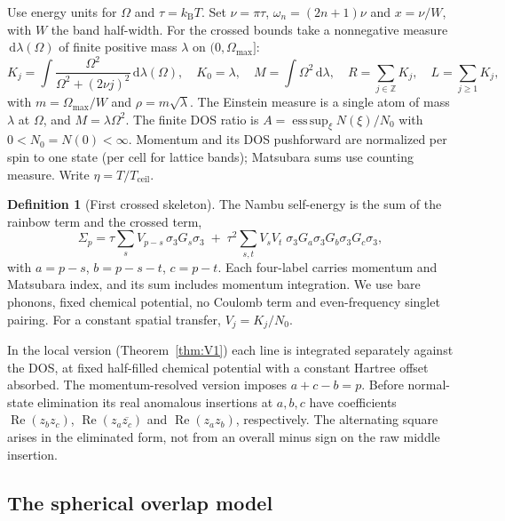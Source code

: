 \documentclass[11pt]{article}
\newcommand{\kB}{k_{\mathrm B}}
\newcommand{\Tceil}{T_{\mathrm{ceil}}}
\newcommand{\dd}{\,\mathrm d}
\theoremstyle{definition}
\newtheorem{definition}[theorem]{Definition}
\theoremstyle{remark}
\begin{document}
Use energy units for $\Omega$ and $\tau=\kB T$. Set $\nu=\pi\tau$, $\omega_n=(2n+1)\nu$ and $x=\nu/W$, with $W$ the band half-width. For the crossed bounds take a nonnegative measure $\dd\lambda(\Omega)$ of finite positive mass $\lambda$ on $(0,\Omega_{\max}]$:
\begin{equation}\label{eq:moments}
K_j=\int\frac{\Omega^2}{\Omega^2+(2\nu j)^2}\dd\lambda(\Omega),\quad K_0=\lambda,\quad M=\int\Omega^2\dd\lambda,\quad R=\sum_{j\in\mathbb Z}K_j,\quad L=\sum_{j\ge1}K_j,
\end{equation}
with $m=\Omega_{\max}/W$ and $\rho=m\sqrt\lambda$. The Einstein measure is a single atom of mass $\lambda$ at $\Omega$, and $M=\lambda\Omega^2$. The finite DOS ratio is $A=\operatorname*{ess\,sup}_\xi N(\xi)/N_0$ with $0<N_0=N(0)<\infty$. Momentum and its DOS pushforward are normalized per spin to one state (per cell for lattice bands); Matsubara sums use counting measure. Write $\eta=T/\Tceil$.

\begin{definition}[First crossed skeleton]\label{def:skeleton}
The Nambu self-energy is the sum of the rainbow term and the crossed term,
\begin{equation}\label{eq:skeleton}
\Sigma_p=\tau\sum_{s}V_{p-s}\,\sigma_3G_s\sigma_3\;+\;\tau^2\sum_{s,t}V_{s}V_{t}\;\sigma_3G_a\sigma_3G_b\sigma_3G_c\sigma_3,
\end{equation}
with $a=p-s$, $b=p-s-t$, $c=p-t$. Each four-label carries momentum and Matsubara index, and its sum includes momentum integration. We use bare phonons, fixed chemical potential, no Coulomb term and even-frequency singlet pairing. For a constant spatial transfer, $V_j=K_j/N_0$.
\end{definition}

In the local version (Theorem~\ref{thm:V1}) each line is integrated separately against the DOS, at fixed half-filled chemical potential with a constant Hartree offset absorbed. The momentum-resolved version imposes $a+c-b=p$. Before normal-state elimination its real anomalous insertions at $a,b,c$ have coefficients $\operatorname{Re}(z_bz_c)$, $\operatorname{Re}(z_a\overline{z_c})$ and $\operatorname{Re}(z_az_b)$, respectively. The alternating square arises in the eliminated form, not from an overall minus sign on the raw middle insertion.

\subsection{The spherical overlap model}
\end{document}
